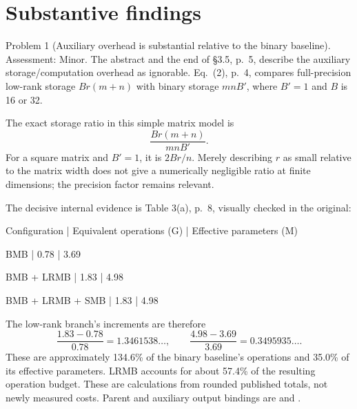 \documentclass[10pt]{article}
\begin{document}
\section*{Substantive findings}
Problem 1 (Auxiliary overhead is substantial relative to the binary baseline).  Assessment: Minor. The abstract and the end of §3.5, p. 5, describe the auxiliary storage/computation overhead as ignorable. Eq. (2), p. 4, compares full-precision low-rank storage \(Br(m+n)\) with binary storage \(mnB'\), where \(B'=1\) and \(B\) is 16 or 32.\par
The exact storage ratio in this simple matrix model is \[\frac{Br(m+n)}{mnB'}.\] For a square matrix and \(B'=1\), it is \(2Br/n\). Merely describing \(r\) as small relative to the matrix width does not give a numerically negligible ratio at finite dimensions; the precision factor remains relevant.\par
The decisive internal evidence is Table 3(a), p. 8, visually checked in the original:\par
Configuration | Equivalent operations (G) | Effective parameters (M)\par
BMB | 0.78 | 3.69\par
BMB + LRMB | 1.83 | 4.98\par
BMB + LRMB + SMB | 1.83 | 4.98\par
The low-rank branch’s increments are therefore \[\frac{1.83-0.78}{0.78}=1.3461538\ldots,\qquad
\frac{4.98-3.69}{3.69}=0.3495935\ldots.\] These are approximately 134.6\% of the binary baseline’s operations and 35.0\% of its effective parameters. LRMB accounts for about 57.4\% of the resulting operation budget. These are calculations from rounded published totals, not newly measured costs. Parent and auxiliary output bindings are and .\par
\end{document}
